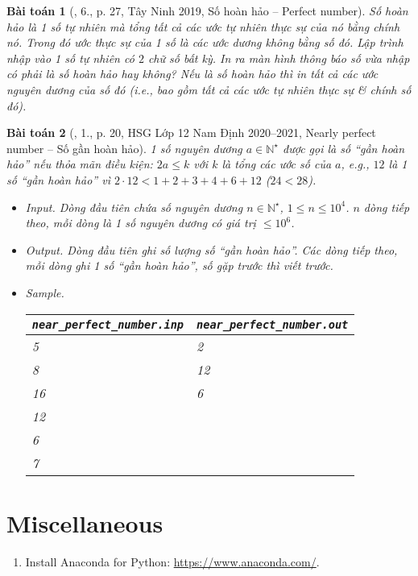 \documentclass{article}
\newtheorem{baitoan}{Bài toán}
\begin{document}
\begin{baitoan}[\cite{VietSTEM2021}, 6., p. 27, Tây Ninh 2019, Số hoàn hảo -- Perfect number]
	\emph{Số hoàn hảo} là 1 số tự nhiên mà tổng tất cả các ước tự nhiên thực sự của nó bằng chính nó. Trong đó ước thực sự của 1 số là các ước dương không bằng số đó. Lập trình nhập vào 1 số tự nhiên có $2$ chữ số bất kỳ. In ra màn hình thông báo số vừa nhập có phải là số hoàn hảo hay không? Nếu là số hoàn hảo thì in tất cả các ước nguyên dương của số đó (i.e., bao gồm tất cả các ước tự nhiên thực sự \& chính số đó).
\end{baitoan}

\begin{baitoan}[\cite{Trung_HSG_THPT_Tin}, 1., p. 20, HSG Lớp 12 Nam Định 2020--2021, Nearly perfect number -- Số gần hoàn hảo]
	1 số nguyên dương $a\in\mathbb{N}^\star$ được gọi là {\rm số ``gần hoàn hảo''} nếu thỏa mãn điều kiện: $2a\le k$ với $k$ là tổng các ước số của $a$, e.g., $12$ là 1 số ``gần hoàn hảo'' vì $2\cdot12 < 1 + 2 + 3 + 4 + 6 + 12$ ($24 < 28$).
	\begin{itemize}
		\item {\sf Input.} Dòng đầu tiên chứa số nguyên dương $n\in\mathbb{N}^\star$, $1\le n\le10^4$. $n$ dòng tiếp theo, mỗi dòng là 1 số nguyên dương có giá trị $\le10^6$.
		\item {\sf Output.} Dòng đầu tiên ghi số lượng số ``gần hoàn hảo''. Các dòng tiếp theo, mỗi dòng ghi 1 số ``gần hoàn hảo'', số gặp trước thì viết trước.
		\item {\sf Sample.}
		\begin{table}[H]
			\centering
			\begin{tabular}{|l|l|}
				\hline
				\verb|near_perfect_number.inp| & \verb|near_perfect_number.out| \\
				\hline
				5 & 2 \\
				8 & 12 \\
				16 & 6 \\
				12 & \\
				6 & \\
				7 & \\
				\hline
			\end{tabular}
		\end{table}
	\end{itemize}
\end{baitoan}


\section{Miscellaneous}

\begin{enumerate}
	\item Install Anaconda for Python: \url{https://www.anaconda.com/}.
\end{enumerate}


\printbibliography[heading=bibintoc]
	
\end{document}
